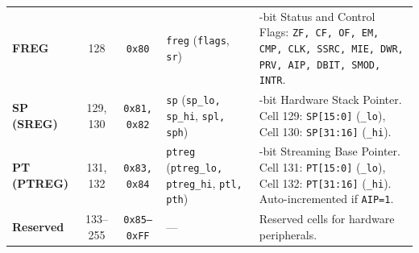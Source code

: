 \documentclass[11pt,a4paper]{article}
\begin{document}
{\begin{tabularx}{\textwidth}{@{} l c c l >{\raggedright\arraybackslash}X @{}}
\textbf{FREG} & 128 & \texttt{0x80} & \texttt{freg} (\texttt{flags}, \texttt{sr}) & 16-bit Status and Control Flags: \texttt{ZF, CF, OF, EM, CMP, CLK, SSRC, MIE, DWR, PRV, AIP, DBIT, SMOD, INTR}. \\
\textbf{SP (SREG)} & 129, 130 & \texttt{0x81, 0x82} & \texttt{sp} (\texttt{sp\_lo, sp\_hi}, \texttt{spl, sph}) & 32-bit Hardware Stack Pointer. Cell 129: \texttt{SP[15:0]} (\texttt{\_lo}), Cell 130: \texttt{SP[31:16]} (\texttt{\_hi}). \\
\textbf{PT (PTREG)} & 131, 132 & \texttt{0x83, 0x84} & \texttt{ptreg} (\texttt{ptreg\_lo, ptreg\_hi}, \texttt{ptl, pth}) & 32-bit Streaming Base Pointer. Cell 131: \texttt{PT[15:0]} (\texttt{\_lo}), Cell 132: \texttt{PT[31:16]} (\texttt{\_hi}). Auto-incremented if \texttt{AIP=1}. \\
\textbf{Reserved} & 133--255 & \texttt{0x85--0xFF} & --- & 123 Reserved cells for hardware peripherals. \\
\bottomrule
\end{tabularx}
}

\vspace{3mm}
\end{document}
